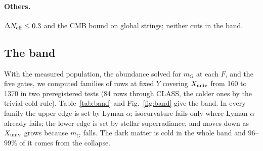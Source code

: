 \documentclass[11pt,a4paper]{article}
\newcommand{\Xu}{X_{\rm univ}}
\begin{document}
\paragraph{Others.} $\Delta N_{\rm eff}\le0.3$ and the CMB bound on global strings; neither cuts in the band.

\subsection{The band}

With the measured population, the abundance solved for $m_G$ at each $F$, and the five gates, we computed families of rows at fixed $Y$ covering $\Xu$ from 160 to 1370 in two preregistered tests (84 rows through CLASS, the colder ones by the trivial-cold rule). Table~\ref{tab:band} and Fig.~\ref{fig:band} give the band.
In every family the upper edge is set by Lyman-$\alpha$; isocurvature fails only where Lyman-$\alpha$ already fails; the lower edge is set by stellar superradiance, and moves down as $\Xu$ grows because $m_G$ falls.
The dark matter is cold in the whole band and $96$--$99\%$ of it comes from the collapse.
\end{document}

